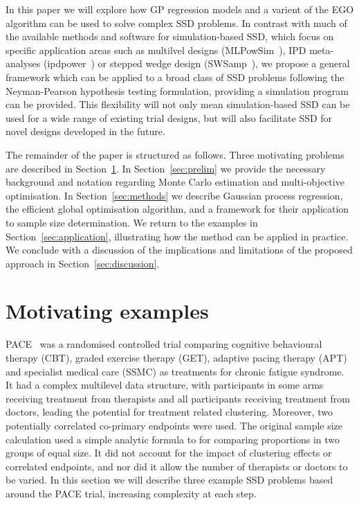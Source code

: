 \documentclass{article} %
\begin{document}
In this paper we will explore how GP regression models and a varient of the EGO algorithm can be used to solve complex SSD problems. In contrast with much of the available methods and software for simulation-based SSD, which focus on specific application areas such as multilvel designs (MLPowSim~\cite{Browne2009}), IPD meta-analyses (ipdpower~\cite{Kontopantelis2016}) or stepped wedge design (SWSamp~\cite{Baio2015}), we propose a general framework which can be applied to a broad class of SSD problems following the Neyman-Pearson hypothesis testing formulation, providing a simulation program can be provided. This flexibility will not only mean simulation-based SSD can be used for a wide range of existing trial designs, but will also facilitate SSD for novel designs developed in the future. 

The remainder of the paper is structured as follows. Three motivating problems are described in Section~\ref{sec:examples}. In Section~\ref{sec:prelim} we provide the necessary background and notation regarding Monte Carlo estimation and multi-objective optimisation. In Section~\ref{sec:methods} we describe Gaussian process regression, the efficient global optimisation algorithm, and a framework for their application to sample size determination. We return to the examples in Section~\ref{sec:application}, illustrating how the method can be applied in practice. We conclude with a discussion of the implications and limitations of the proposed approach in Section~\ref{sec:discussion}.


\section{Motivating examples}\label{sec:examples}

PACE~\cite{White2007, White2011} was a randomised controlled trial comparing cognitive behavioural therapy (CBT), graded exercise therapy (GET), adaptive pacing therapy (APT) and specialist medical care (SSMC) as treatments for chronic fatigue syndrome. It had a complex multilevel data structure, with participants in some arms receiving treatment from therapists and all participants receiving treatment from doctors, leading the potential for treatment related clustering. Moreover, two potentially correlated co-primary endpoints were used. The original sample size calculation used a simple analytic formula to for comparing proportions in two groups of equal size. It did not account for the impact of clustering effects or correlated endpoints, and nor did it allow the number of therapists or doctors to be varied. In this section we will describe three example SSD problems based around the PACE trial, increasing complexity at each step. 
\end{document}

